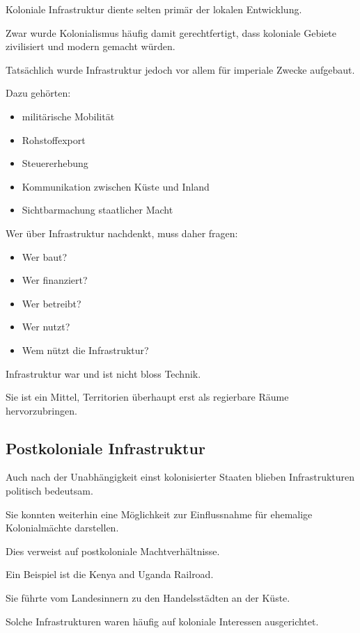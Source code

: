 Koloniale Infrastruktur diente selten
primär der lokalen Entwicklung.

Zwar wurde Kolonialismus häufig damit gerechtfertigt,
dass koloniale Gebiete zivilisiert
und modern gemacht würden.

Tatsächlich wurde Infrastruktur jedoch vor allem
für imperiale Zwecke aufgebaut.

Dazu gehörten:

\begin{itemize}
\item militärische Mobilität
\item Rohstoffexport
\item Steuererhebung
\item Kommunikation zwischen Küste und Inland
\item Sichtbarmachung staatlicher Macht
\end{itemize}

Wer über Infrastruktur nachdenkt,
muss daher fragen:

\begin{itemize}
\item Wer baut?
\item Wer finanziert?
\item Wer betreibt?
\item Wer nutzt?
\item Wem nützt die Infrastruktur?
\end{itemize}

Infrastruktur war und ist nicht bloss Technik.

Sie ist ein Mittel,
Territorien überhaupt erst
als regierbare Räume hervorzubringen.

\subsection{Postkoloniale Infrastruktur}

Auch nach der Unabhängigkeit
einst kolonisierter Staaten
blieben Infrastrukturen politisch bedeutsam.

Sie konnten weiterhin eine Möglichkeit
zur Einflussnahme
für ehemalige Kolonialmächte darstellen.

Dies verweist auf postkoloniale Machtverhältnisse.

Ein Beispiel ist die Kenya and Uganda Railroad.

Sie führte vom Landesinnern
zu den Handelsstädten an der Küste.

Solche Infrastrukturen waren häufig
auf koloniale Interessen ausgerichtet.


